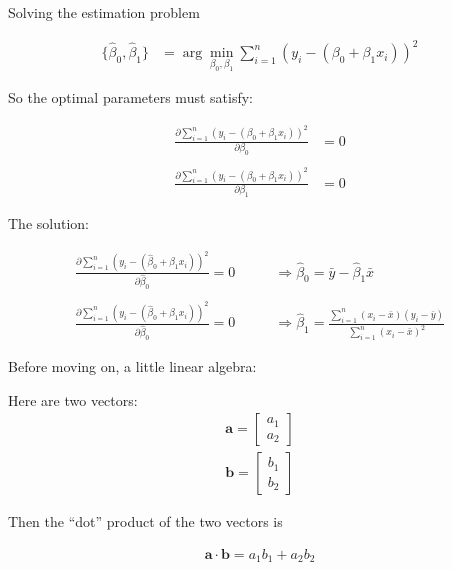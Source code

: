 \documentclass[aspectratio=169]{beamer}
\begin{document}
\begin{frame}{Solving the estimation problem}

\begin{align*}
\{\hat{\beta}_0, \hat{\beta}_1\} &= \arg \min_{\beta_0,\beta_1} \sum_{i=1}^n (y_i - (\beta_0 + \beta_1 x_i))^2
\end{align*}

So the optimal parameters must satisfy:


\begin{align*}
\frac{\partial \sum_{i=1}^n (y_i - (\beta_0 + \beta_1 x_i))^2}{\partial \beta_0} &= 0\\\\
\frac{\partial  \sum_{i=1}^n(y_i - (\beta_0 + \beta_1 x_i))^2}{\partial \beta_1} &= 0
\end{align*}
\end{frame}

\begin{frame}{The solution: }

\begin{align*}
\frac{\partial  \sum_{i=1}^n(y_i - (\hat{\beta}_0 + \hat{\beta}_1 x_i))^2}{\partial \hat{\beta}_0} = 0 \quad\quad &\Rightarrow \hat{\beta}_0  =\bar{y} - \hat{\beta}_1\bar{x}\\\\
\frac{\partial   \sum_{i=1}^n(y_i - (\hat{\beta}_0 + \hat{\beta}_1 x_i))^2}{\partial \hat{\beta}_0} = 0 \quad\quad &\Rightarrow 
\hat{\beta}_1 = \frac{ \sum_{i=1}^n(x_i-\bar{x})(y_i-\bar{y})}{\sum_{i=1}^n (x_i-\bar{x})^2}
\end{align*}

\end{frame}

\begin{frame}{Before moving on, a little linear algebra:}

Here are two vectors:  
\begin{align*}
\mathbf{a} =  
\begin{bmatrix} 
	a_1 \\
	a_2  
\end{bmatrix}\\
\mathbf{b}=
 \begin{bmatrix}
	b_1\\
	b_2
\end{bmatrix} 
\end{align*}

Then the ``dot'' product of the two vectors is

\begin{align*}
\mathbf{a}\cdot \mathbf{b} = a_1b_1 + a_2b_2
\end{align*}

\end{frame}
\end{document}
